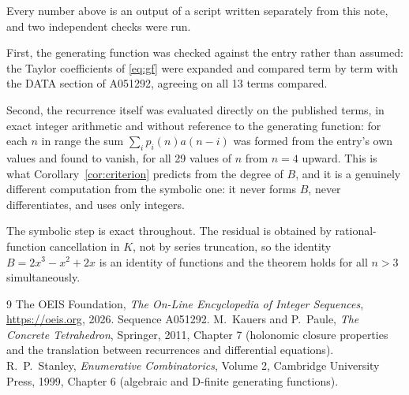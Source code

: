 \documentclass[11pt,a4paper]{article}
\theoremstyle{plain}
\theoremstyle{definition}
\begin{document}
Every number above is an output of a script written separately from this note, and two
independent checks were run.

First, the generating function was checked against the entry rather than assumed: the
Taylor coefficients of \eqref{eq:gf} were expanded and compared term by term with the DATA
section of A051292, agreeing on all 13 terms compared.

Second, the recurrence itself was evaluated directly on the published terms, in exact
integer arithmetic and without reference to the generating function: for each $n$ in range
the sum $\sum_{i}p_{i}(n)a(n-i)$ was formed from the entry's own values and found to
vanish, for all 29 values of $n$ from $n=4$ upward. This is what
Corollary~\ref{cor:criterion} predicts from the degree of $B$, and it is a genuinely
different computation from the symbolic one: it never forms $B$, never differentiates, and
uses only integers.

The symbolic step is exact throughout. The residual is obtained by rational-function
cancellation in $K$, not by series truncation, so the identity $B=2 x^{3} - x^{2} + 2 x$ is an
identity of functions and the theorem holds for all $n>3$ simultaneously.

\begin{thebibliography}{9}
 The OEIS Foundation, \emph{The On-Line Encyclopedia of Integer Sequences},
\url{https://oeis.org}, 2026. Sequence A051292.
 M.~Kauers and P.~Paule, \emph{The Concrete Tetrahedron}, Springer, 2011,
Chapter 7 (holonomic closure properties and the translation between recurrences and
differential equations).
 R.~P.~Stanley, \emph{Enumerative Combinatorics}, Volume 2, Cambridge
University Press, 1999, Chapter 6 (algebraic and D-finite generating functions).
\end{thebibliography}
\end{document}
